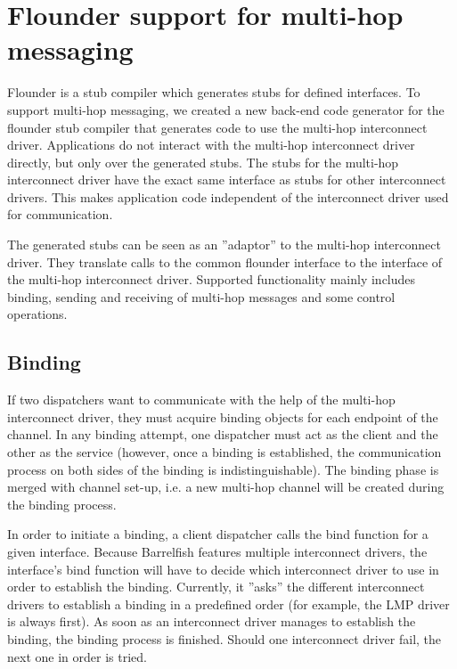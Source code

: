 \documentclass[a4paper,twoside]{report} %
\begin{document}
\chapter{Flounder support for multi-hop messaging}
\label{chapter: flounder integration}

Flounder is a stub compiler which generates stubs for defined interfaces. To support multi-hop messaging, we created a new back-end code generator for the flounder stub compiler that generates code to use the multi-hop interconnect driver.  Applications do not interact with the multi-hop interconnect driver directly, but only over the generated stubs. The stubs for the multi-hop interconnect driver have the exact same interface as stubs for other interconnect drivers. This makes application code independent of the interconnect driver used for communication.

The generated stubs can be seen as an ''adaptor'' to the multi-hop interconnect driver. They  translate calls to the common flounder interface to the interface of the multi-hop interconnect driver. Supported functionality mainly includes binding, sending and receiving of multi-hop messages and some control operations.

\section{Binding}
If two dispatchers want to communicate with the help of the multi-hop interconnect driver, they must acquire binding objects for each endpoint of the channel. In any binding attempt, one dispatcher must act as the client and the other as the service (however, once a binding is established, the communication process on both sides of the binding is indistinguishable). The binding phase is merged with channel set-up, i.e. a new multi-hop channel will be created during the binding process. 

In order to initiate a binding, a client dispatcher calls the bind function for a given interface. Because Barrelfish features multiple interconnect drivers, the interface's bind function will have to decide which interconnect driver to use in order to establish the binding. Currently, it ''asks'' the different interconnect drivers to establish a binding in a predefined order (for example, the LMP driver is always first). As soon as an interconnect driver manages to establish the binding, the binding process is finished. Should one interconnect driver fail, the next one in order is tried.
\end{document}
